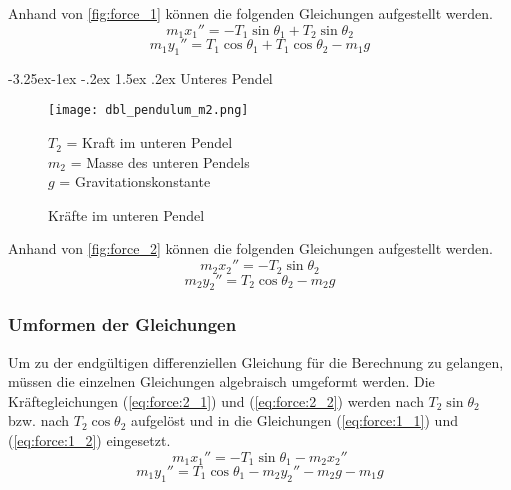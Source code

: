 \documentclass[12pt]{article}
\makeatletter
\numberwithin{equation}{subsection}
\renewcommand\paragraph{\@startsection{paragraph}{4}{\z@}%
  {-3.25ex\@plus -1ex \@minus -.2ex}%
  {1.5ex \@plus .2ex}%
  {\normalfont\normalsize\bfseries}}
\makeatother
\begin{document}
Anhand von \autoref{fig:force_1} können die folgenden Gleichungen aufgestellt werden.
\begin{equation} \label{eq:force:1_1}
	m_1 x_1'' = -T_1\sin\theta_1 + T_2\sin\theta_2
\end{equation}
\begin{equation} \label{eq:force:1_2}
	m_1 y_1'' = T_1\cos\theta_1 + T_1\cos\theta_2 - m_1 g
\end{equation}
\clearpage

\paragraph{Unteres Pendel}
\begin{figure}[H]
	\begin{minipage}[!b]{0.5\textwidth}
		\centering
		\texttt{[image: dbl\_pendulum\_m2.png]}
		\caption[Kräfte im unteren Pendel]{Kräfte im unteren Pendel \citep{neumann04}}
		\label{fig:force_2}
	\end{minipage}
	\begin{minipage}[!t]{\textwidth}
		\vspace{0pt}\raggedright
		$T_2$ = Kraft im unteren Pendel\\
		$m_2$ = Masse des unteren Pendels\\
		$g$ = Gravitationskonstante
	\end{minipage}
\end{figure}

Anhand von \autoref{fig:force_2} können die folgenden Gleichungen aufgestellt werden.
\begin{equation} \label{eq:force:2_1}
	m_2 x_2'' = -T_2\sin\theta_2
\end{equation}
\begin{equation} \label{eq:force:2_2}
	m_2 y_2'' = T_2\cos\theta_2 - m_2 g
\end{equation}

\subsubsection{Umformen der Gleichungen}
Um zu der endgültigen differenziellen Gleichung für die Berechnung zu gelangen, müssen die einzelnen Gleichungen algebraisch umgeformt werden. Die Kräftegleichungen (\ref{eq:force:2_1}) und (\ref{eq:force:2_2}) werden nach $T_2\sin\theta_2$ bzw. nach $T_2\cos\theta_2$ aufgelöst und in die Gleichungen (\ref{eq:force:1_1}) und (\ref{eq:force:1_2}) eingesetzt.
\begin{equation} \label{eq:dForce:1}
	m_1 x_1'' = -T_1\sin\theta_1 - m_2 x_2''
\end{equation}
\begin{equation} \label{eq:dForce:2}
	m_1 y_1'' = T_1\cos\theta_1 -m_2 y_2'' - m_2 g - m_1 g
\end{equation}
\end{document}
